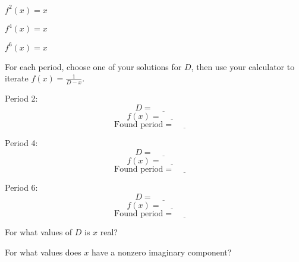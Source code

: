 \documentclass[../gatm_answers.tex]{subfiles}
\begin{document}
\begin{inner_problem}[start=1]
\item $f^2(x)=x$
\end{inner_problem}

\begin{inner_problem}
\item $f^4(x)=x$
\end{inner_problem}

\begin{inner_problem}
\item $f^6(x)=x$
\end{inner_problem}

\begin{outer_problem}
\item For each period, choose one of your solutions for $D$, then use your calculator to iterate $f(x)=\frac{1}{D-x}$.
\end{outer_problem}

\begin{inner_problem}[start=1]
\item Period 2: $$D=\underline{\phantom{00000}}$$ $$f(x)=\underline{\phantom{00000}}$$ $$\text{Found period}=\underline{\phantom{00000}}$$
\end{inner_problem}

\begin{inner_problem}
\item Period 4: $$D=\underline{\phantom{00000}}$$ $$f(x)=\underline{\phantom{00000}}$$ $$\text{Found period}=\underline{\phantom{00000}}$$
\end{inner_problem}

\begin{inner_problem}
\item Period 6: $$D=\underline{\phantom{00000}}$$ $$f(x)=\underline{\phantom{00000}}$$ $$\text{Found period}=\underline{\phantom{00000}}$$
\end{inner_problem}

\begin{outer_problem}
\item
\end{outer_problem}

\begin{inner_problem}[start=1]
\item For what values of $D$ is $x$ real?
\end{inner_problem}

\begin{inner_problem}
\item For what values does $x$ have a nonzero imaginary component?
\end{inner_problem}
\end{document}
